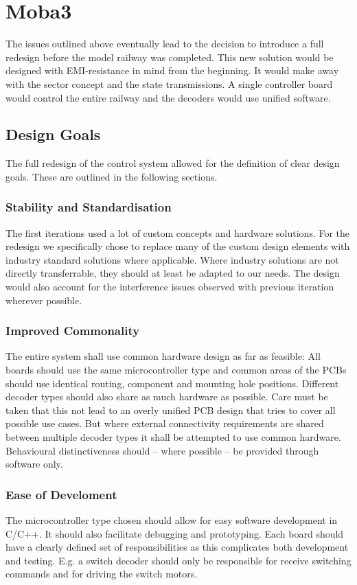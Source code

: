 \documentclass{scrreprt}
\begin{document}
\section{Moba3}
The issues outlined above eventually lead to the decision to introduce a full redesign before the model railway was completed.
This new solution would be designed with EMI-resistance in mind from the beginning.
It would make away with the sector concept and the state transmissions.
A single controller board would control the entire railway and the decoders would use unified software.

\subsection{Design Goals}
The full redesign of the control system allowed for the definition of clear design goals. These are outlined in the following sections.

\subsubsection{Stability and Standardisation}
The first iterations used a lot of custom concepts and hardware solutions.
For the redesign we specifically chose to replace many of the custom design elements with industry standard solutions where applicable.
Where industry solutions are not directly transferrable, they should at least be adapted to our needs.
The design would also account for the interference issues observed with previous iteration wherever possible.

\subsubsection{Improved Commonality}
The entire system shall use common hardware design as far as feasible:
All boards should use the same microcontroller type and common areas of the PCBs should use identical routing, component and mounting hole positions.
Different decoder types should also share as much hardware as possible.
Care must be taken that this not lead to an overly unified PCB design that tries to cover all possible use cases.
But where external connectivity requirements are shared between multiple decoder types it shall be attempted to use common hardware.
Behavioural distinctiveness should -- where possible -- be provided through software only.

\subsubsection{Ease of Develoment}
The microcontroller type chosen should allow for easy software development in C/C++.
It should also facilitate debugging and prototyping.
Each board should have a clearly defined set of responsibilities as this complicates both development and testing.
E.g. a switch decoder should only be responsible for receive switching commands and for driving the switch motors.
\end{document}
